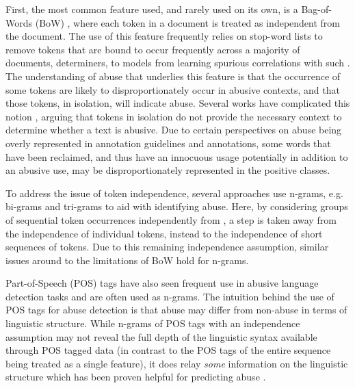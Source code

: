 First, the most common feature used, and rarely used on its own, is a Bag-of-Words (BoW) \citep{Fortuna:2018,Davidson:2017}, where each token in a document is treated as independent from  the document.
The use of this feature frequently relies on  stop-word lists to remove tokens that are bound to occur frequently across a majority of documents,  determiners, to  models from learning spurious correlations with such .
The understanding of abuse that underlies this feature is that the occurrence of some tokens are likely to disproportionately occur in abusive contexts, and that those tokens, in isolation, will indicate abuse.
Several works have complicated this notion \citep[e.g.]{Waseem:2018,Davidson:2019}, arguing that tokens  in isolation do not provide the necessary context to determine whether a text is abusive.
Due to certain perspectives on abuse being overly represented \citep{Waseem:2016} in annotation guidelines and annotations, some words that have been reclaimed, and thus have an innocuous usage potentially in addition to an abusive use, may be disproportionately represented in the positive classes.

To address the issue of token independence, several approaches use n-grams, e.g. bi-grams \citep{Waseem:2016} and tri-grams \citep{Davidson:2017} to aid with identifying abuse.
Here, by considering groups of sequential token occurrences independently from , a step is taken away from the independence of individual tokens, instead to the independence of short sequences of tokens.
Due to this remaining independence assumption, similar issues around to the limitations of BoW hold for n-grams.

Part-of-Speech (POS) tags have also seen frequent use in abusive language detection tasks \citep{Fortuna:2018} and are often used as n-grams.
The intuition behind the use of POS tags for abuse detection is that abuse may differ from non-abuse in terms of linguistic structure.
While n-grams of POS tags with an independence assumption may not reveal the full depth of the linguistic syntax available through POS tagged data (in contrast to the POS tags of the entire sequence being treated as a single feature), it does relay \textit{some} information on the linguistic structure which has been proven helpful for predicting abuse \citep{Fortuna:2018}.

